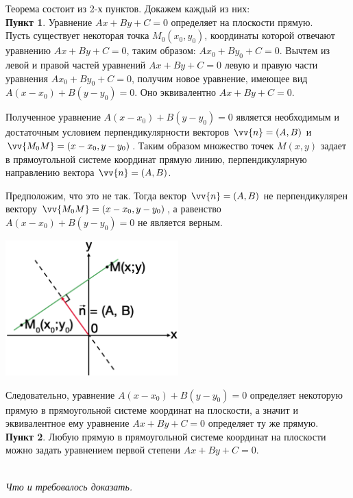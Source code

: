 \documentclass[a4paper,12pt,oneside]{extbook}
\newcommand{\newpar}{$ $\par\nobreak\ignorespaces}
\theoremstyle{numbered}
\theoremstyle{unnumbered}
\theoremstyle{named}
\theoremstyle{unnumbered}
\theoremstyle{named}
\theoremstyle{named}
\theoremstyle{named}
\renewenvironment{proof}[1][]{\breakenv[Доказательство]{\if\relax\detokenize{#1}\relax\else\;\fi}{\textbf{#1}}}{\smallskip\newpar \hfill\textit{Что и требовалось доказать.}}
\begin{document}
\begin{proof}
    Теорема состоит из 2-х пунктов.
    Докажем каждый из них: \\

    \textbf{Пункт 1}. Уравнение \(Ax + By + C = 0\) определяет на плоскости прямую. \\

    Пусть существует некоторая точка \(M_0(x_0, y_0)\), координаты которой отвечают уравнению \(Ax + By + C = 0\), таким образом: \(Ax_0 + By_0 + C = 0\).
    Вычтем из левой и правой частей уравнений \(Ax + By + C = 0\) левую и правую части уравнения \(Ax_0 + By_0 + C = 0\), получим новое уравнение, имеющее вид \(A(x - x_0) + B(y - y_0) = 0\).
    Оно эквивалентно \(Ax + By + C = 0\).

    Полученное уравнение \(A(x - x_0) + B(y - y_0) = 0\) является необходимым и достаточным условием перпендикулярности векторов \(\vv{n} = (A, B)\) и \(\vv{M_0M} = (x - x_0, y - y_0)\).
    Таким образом множество точек \(M(x, y)\) задает в прямоугольной системе координат прямую линию, перпендикулярную направлению вектора \(\vv{n} = (A, B)\).

    Предположим, что это не так. Тогда вектор \(\vv{n} = (A, B)\) не перпендикулярен вектору \(\vv{M_0M} = (x - x_0, y - y_0)\), а равенство \(A(x - x_0) + B(y - y_0) = 0\) не является верным.

    \begin{center}
        \includegraphics[width=0.5\textwidth]{general_line.png}
    \end{center}

    Следовательно, уравнение \(A(x - x_0) + B(y - y_0) = 0\) определяет некоторую прямую в прямоугольной системе координат на плоскости, а значит и эквивалентное ему уравнение \(Ax + By + C = 0\) определяет ту же прямую. \\

    \textbf{Пункт 2}. Любую прямую в прямоугольной системе координат на плоскости можно задать уравнением первой степени \(Ax + By + C = 0\). \\


\end{proof}
\end{document}
